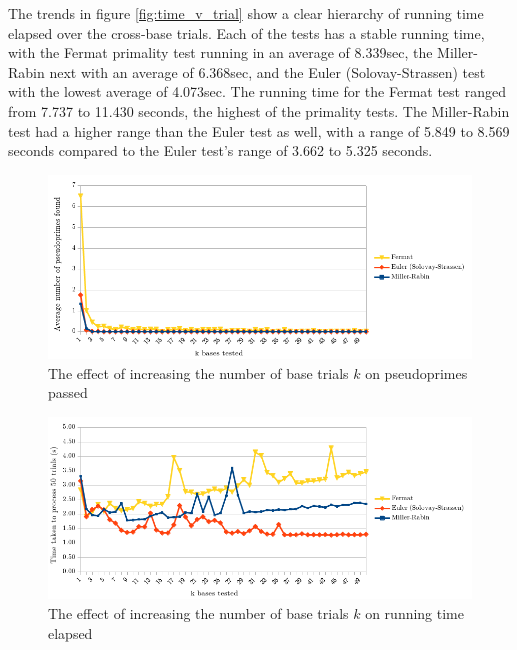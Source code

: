 \documentclass{article}
\begin{document}
The trends in figure \ref{fig:time_v_trial} show a clear hierarchy of running time elapsed over the cross-base trials. Each of the tests has a stable running time, with the Fermat primality test running in an average of 8.339sec, the Miller-Rabin next with an average of 6.368sec, and the Euler (Solovay-Strassen) test with the lowest average of 4.073sec. The running time for the Fermat test ranged from 7.737 to 11.430 seconds, the highest of the primality tests. The Miller-Rabin test had a higher range than the Euler test as well, with a range of 5.849 to 8.569 seconds compared to the Euler test's range of 3.662 to 5.325 seconds.

\FloatBarrier
\begin{figure}[h!]
\caption{The effect of increasing the number of base trials $k$ on pseudoprimes passed}
\label{fig:pprimes_v_bases}
\centering
\includegraphics[width=\textwidth]{pprimes_v_bases}
\end{figure}
\FloatBarrier

\FloatBarrier
\begin{figure}[h!]
\caption{The effect of increasing the number of base trials $k$ on running time elapsed}
\label{fig:time_v_bases}
\centering
\includegraphics[width=\textwidth]{time_v_bases}
\end{figure}
\FloatBarrier
\end{document}
